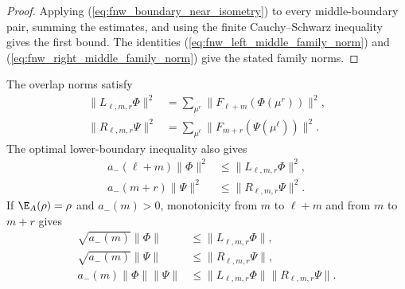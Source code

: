 \begin{proof}
    \leanok
    Applying (\ref{eq:fnw_boundary_near_isometry}) to every middle-boundary
    pair, summing the estimates, and using the finite Cauchy--Schwarz
    inequality gives the first bound. The identities
    (\ref{eq:fnw_left_middle_family_norm}) and
    (\ref{eq:fnw_right_middle_family_norm}) give the stated family norms.
\end{proof}

\begin{lemma}
    \label{thm:fnw_overlap_lower_boundary_control}
    \leanok
    The overlap norms satisfy
    \begin{align}
        \lVert L_{\ell,m,r}\Phi\rVert^2
         & =\sum_{\mu^r}\lVert F_{\ell+m}(\Phi(\mu^r))\rVert^2,
        \label{eq:fnw_left_overlap_norm}                           \\
        \lVert R_{\ell,m,r}\Psi\rVert^2
         & =\sum_{\mu^\ell}\lVert F_{m+r}(\Psi(\mu^\ell))\rVert^2.
        \label{eq:fnw_right_overlap_norm}
    \end{align}
    The optimal lower-boundary inequality also gives
    \begin{align}
        a_-(\ell+m)\lVert\Phi\rVert^2
         & \leq\lVert L_{\ell,m,r}\Phi\rVert^2,
        \label{eq:fnw_left_overlap_lower_boundary} \\
        a_-(m+r)\lVert\Psi\rVert^2
         & \leq\lVert R_{\ell,m,r}\Psi\rVert^2.
        \label{eq:fnw_right_overlap_lower_boundary}
    \end{align}
    If $\E_A(\rho)=\rho$ and $a_-(m)>0$, monotonicity from $m$ to
    $\ell+m$ and from $m$ to $m+r$ gives
    \begin{align}
        \sqrt{a_-(m)}\lVert\Phi\rVert
         & \leq\lVert L_{\ell,m,r}\Phi\rVert,
        \label{eq:fnw_left_overlap_sqrt_lower_boundary}  \\
        \sqrt{a_-(m)}\lVert\Psi\rVert
         & \leq\lVert R_{\ell,m,r}\Psi\rVert,
        \label{eq:fnw_right_overlap_sqrt_lower_boundary} \\
        a_-(m)\lVert\Phi\rVert\lVert\Psi\rVert
         & \leq\lVert L_{\ell,m,r}\Phi\rVert
        \lVert R_{\ell,m,r}\Psi\rVert.
        \label{eq:fnw_overlap_lower_boundary_control}
    \end{align}
\end{lemma}

